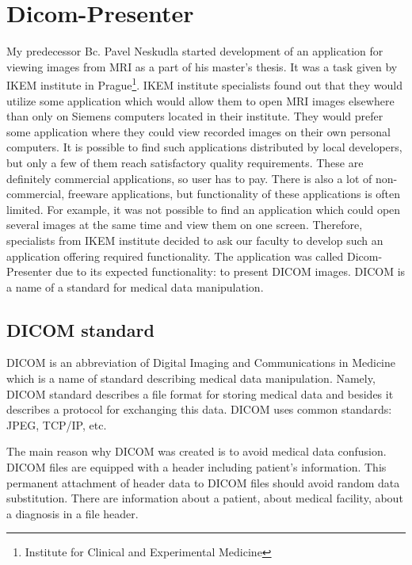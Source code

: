 \chapter{Dicom-Presenter}
\vspace{-10mm}

My predecessor Bc. Pavel Neskudla started development of an application for viewing images from MRI as a part of his master's thesis\cite{neskudla}. It was a task given by IKEM institute in Prague\footnote{Institute for Clinical and Experimental Medicine}. IKEM institute specialists found out that they would utilize some application which would allow them to open MRI images elsewhere than only on Siemens computers located in their institute. They would prefer some application where they could view recorded images on their own personal computers. It is possible to find such applications distributed by local developers, but only a few of them reach satisfactory quality requirements. These are definitely commercial applications, so user has to pay. There is also a lot of non-commercial, freeware applications, but functionality of these applications is often limited\cite[page~9]{flaska_bc}. For example, it was not possible to find an application which could open several images at the same time and view them on one screen. Therefore, specialists from IKEM institute decided to ask our faculty to develop such an application offering required functionality. The application was called Dicom-Presenter due to its expected functionality: to present DICOM images. DICOM is a name of a standard for medical data manipulation.

\section{DICOM standard}

DICOM is an abbreviation of Digital Imaging and Communications in Medicine which is a name of standard describing medical data manipulation. Namely, DICOM standard describes a file format for storing medical data and besides it describes a protocol for exchanging this data. DICOM uses common standards: JPEG, TCP/IP, etc.

The main reason why DICOM was created is to avoid medical data confusion. DICOM files are equipped with a header including patient's information. This permanent attachment of header data to DICOM files should avoid random data substitution. There are information about a patient, about medical facility, about a diagnosis in a file header.



